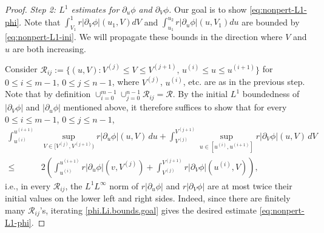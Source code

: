 \documentclass[10pt, reqno]{amsart}
\theoremstyle{definition}
\theoremstyle{remark}
\numberwithin{equation}{section}
\newcommand{\abs}[1]{\vert#1\vert}
\newcommand{\rd}{\partial}
\newcommand{\0}{\emptyset}
\newcommand{\calR}{\mathcal R}
\newcommand{\pfstep}[1]{\vspace{.5em} {\it \noindent #1.}}
\begin{document}
\begin{proof}
\pfstep{Step 2: $L^{1}$ estimates for $\rd_u\phi$ and $\rd_{V}\phi$} Our goal is to show \eqref{eq:nonpert-L1-phi}.
Note that $\int_{V_{1}}^{1} r|\rd_{V}\phi| (u_{1}, V) d V$ and $\int_{u_{1}}^{u_{2}} r|\rd_{u}\phi| (u, V_{1}) d u$ are bounded by \eqref{eq:nonpert-L1-ini}. We will propagate these bounds in the direction where $V$ and $u$ are both increasing.

Consider $\mathcal R_{ij}:=\{(u, V): V^{(j)}\leq V \leq V^{(j+1)}, \, u^{(i)}\leq u\leq u^{(i+1)}\}$ for $0\leq i\leq m-1$, $0\leq j\leq n-1$, where $V^{(j)}$, $u^{(i)}$, etc. are as in the previous step. Note that by definition $\cup_{i=0}^{m-1}\cup_{j=0}^{n-1} \mathcal R_{ij}=\mathcal R$. By the initial $L^{1}$ boundedness of $|\rd_{V}\phi|$ and $|\rd_u\phi|$ mentioned above, it therefore suffices to show that for every $0\leq i\leq m-1$, $0\leq j\leq n-1$,
\begin{equation}\label{phi.Li.bounds.goal}
\begin{aligned}
\int_{u^{(i)}}^{u^{(i+1)}} & \sup_{V \in [V^{(j)}, V^{(j+1)})} r \abs{\rd_{u} \phi}(u, V) \, d u 
+ \int_{V^{(j)}}^{V^{(j+1)}} \sup_{u \in [u^{(i)}, u^{(i+1)}]} r \abs{\rd_{V} \phi}(u, V) \, d V \\
\leq & 2  \left( \int_{u^{(i)}}^{u^{(i+1)}} r |\rd_{u}\phi|(v,V^{(j)})+\int_{V^{(j)}}^{V^{(j+1)}} r |\rd_{V}\phi|(u^{(i)},V)\right),
\end{aligned}
\end{equation}
i.e.,  in every $\mathcal R_{ij}$, the $L^{1} L^{\infty}$ norm of $r |\rd_u\phi|$ and $r |\rd_{V}\phi|$ are at most twice their initial values on the lower left and right sides. Indeed, since there are finitely many $\calR_{ij}$'s, iterating \eqref{phi.Li.bounds.goal} gives the desired estimate \eqref{eq:nonpert-L1-phi}.


\end{proof}
\end{document}
